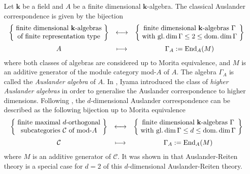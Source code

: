 \documentclass{amsart}
\newcommand{\bk}{\mathbf{k}}
\newcommand{\calC}{\mathcal{C}}
\newcommand{\End}{\mathrm{End}}
\theoremstyle{plain}
\theoremstyle{definition}
\numberwithin{equation}{section}
\begin{document}
Let $\bk$ be a field and $A$ be a finite dimensional $\bk$-algebra. The classical Auslander correspondence \cite{Auslander71} is given by the bijection 
\[
\begin{array}{ccc}
\left\{\hspace{-0.2em}
\begin{array}{c}
   \text{finite dimensional $\bk$-algebras} \\
   \text{of finite representation type}
\end{array}
\hspace{-0.2em}\right\}
&
\longleftrightarrow
&
\left\{\hspace{-0.2em}
\begin{array}{c}
   \text{finite dimensional $\bk$-algebras $\Gamma$} \\
   \text{with $\operatorname{gl.dim}\Gamma\le 2\le \operatorname{dom.dim}\Gamma$}
\end{array}
\hspace{-0.2em}\right\}
\\[1.2em]
A
&
\longmapsto
&
\Gamma_A := \End_A(M)
\end{array}
\]
where both classes of algebras are considered up to Morita equivalence, and $M$ is an additive generator of the module category mod-$A$ of $A$. The algebra $\Gamma_A$ is called the {\it Auslander algebra} of $A$. 
In \cite{Iyama07a}, Iyama introduced the class of {\it higher Auslander algebras} in order to generalise the Auslander correspondence to higher dimensions. 
Following \cite{Iyama07a}, the $d$-dimensional Auslander correspondence can be described as the following bijection up to Morita equivalence
\[
\begin{array}{ccc}
\left\{\hspace{-0.2em}
\begin{array}{c}
   \text{finite maximal $d$-orthogonal} \\
   \text{subcategories $\calC$ of mod-$A$}
\end{array}
\hspace{-0.2em}\right\}
&
\longleftrightarrow
&
\left\{\hspace{-0.2em}
\begin{array}{c}
   \text{finite dimensional $\bk$-algebras $\Gamma$} \\
   \text{with $\operatorname{gl.dim}\Gamma\le d\le \operatorname{dom.dim}\Gamma$}
\end{array}
\hspace{-0.2em}\right\}
\\[1.2em]
\calC
&
\longmapsto
&
\Gamma_A := \End_A(M)
\end{array}
\]
where $M$ is an additive generator of $\calC$. It was shown in \cite{Iyama07b} that Auslander-Reiten theory is a special case for $d=2$ of this $d$-dimensional Auslander-Reiten theory.
\end{document}
